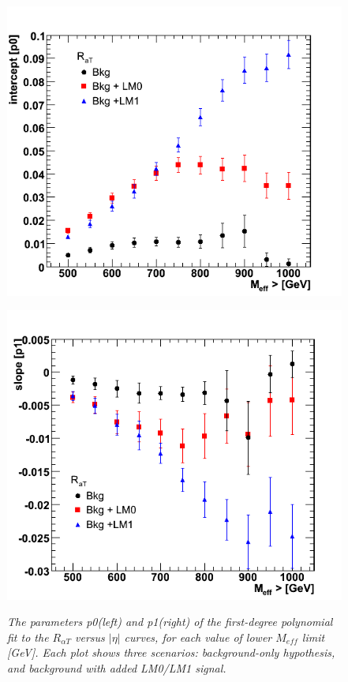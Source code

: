 \begin{figure}[h!]
\begin{minipage}[b]{0.5\linewidth}
\centering
{\label{fig:meff_p0}\includegraphics[scale=0.4]{./plots/Meff-NT7-p0-MCerr}} 
\end{minipage}
\begin{minipage}[b]{0.5\linewidth}
\centering
{\label{fig:meff_p1}\includegraphics[scale=0.4]{./plots/Meff-NT7-p1-MCerr}} 
\end{minipage}
\caption{\small{\textit{The parameters p0(left) and p1(right) of the first-degree polynomial fit to the $R_{\alpha T}$ versus $|\eta|$ curves, for each value of lower $M_{eff}$ limit [GeV]. Each plot shows three scenarios: background-only hypothesis, and background with added LM0/LM1 signal.}}}
\label{fig:meff4}
\end{figure}


